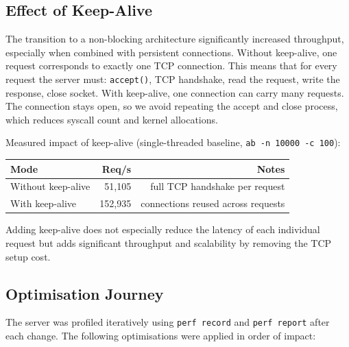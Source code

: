 \documentclass{article}
\begin{document}
\subsection{Effect of Keep-Alive}

The transition to a non-blocking architecture significantly increased throughput, especially
when combined with persistent connections. Without keep-alive, one request corresponds to
exactly one TCP connection. This means that for every request the server must:
\texttt{accept()}, TCP handshake, read the request, write the response, close socket. With
keep-alive, one connection can carry many requests. The connection stays open, so we avoid
repeating the accept and close process, which reduces syscall count and kernel allocations.

\medskip
\noindent Measured impact of keep-alive (single-threaded baseline, \texttt{ab -n 10000 -c 100}):

\begin{center}
\begin{tabular}{lrr}
\toprule
\textbf{Mode} & \textbf{Req/s} & \textbf{Notes} \\
\midrule
Without keep-alive & 51,105 & full TCP handshake per request \\
With keep-alive    & 152,935 & connections reused across requests \\
\bottomrule
\end{tabular}
\end{center}

Adding keep-alive does not especially reduce the latency of each individual request but adds
significant throughput and scalability by removing the TCP setup cost.

\subsection{Optimisation Journey}

The server was profiled iteratively using \texttt{perf record} and \texttt{perf report} after
each change. The following optimisations were applied in order of impact:
\end{document}
